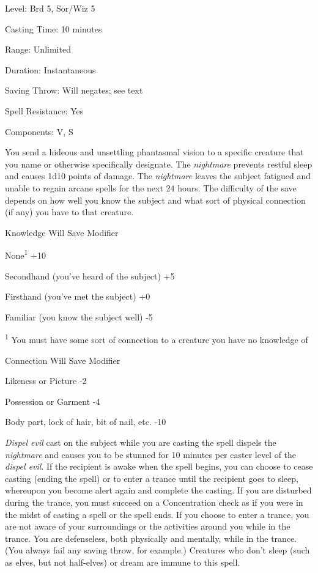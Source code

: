 
\begin{description*}
\item[Level:] Brd 5, Sor/Wiz 5
\item[Casting Time:] 10 minutes
\item[Range:] Unlimited
\item[Duration:] Instantaneous
\item[Saving Throw:] Will negates; see text
\item[Spell Resistance:] Yes
\item[Components:] V, S
\end{description*}

You send a hideous and unsettling phantasmal vision to a specific creature that
you name or otherwise specifically designate.
The \textit{nightmare} prevents restful sleep and causes 1d10 points of damage.
The \textit{nightmare} leaves the subject fatigued and unable to regain arcane
spells for the next 24 hours.
The difficulty of the save depends on how well you know the subject and what sort
of physical connection (if any) you have to that creature.
\begin{description*}
\item[Knowledge] Will Save Modifier
\item[None\textsuperscript{1}] +10
\item[Secondhand (you've heard of the subject)] +5
\item[Firsthand (you've met the subject)] +0
\item[Familiar (you know the subject well)] -5
\end{description*}
\textsuperscript{1} You must have some sort of connection to a creature you have no knowledge of
\begin{description*}
\item[Connection] Will Save Modifier
\item[Likeness or Picture] -2
\item[Possession or Garment] -4
\item[Body part, lock of hair, bit of nail, etc.] -10
\end{description*}
\textit{Dispel evil} cast on the subject while you are casting the spell dispels
the \textit{nightmare} and causes you to be stunned for 10 minutes per caster level
of the \textit{dispel evil}.
If the recipient is awake when the spell begins, you can choose to cease casting
(ending the spell) or to enter a trance until the recipient goes to sleep, whereupon
you become alert again and complete the casting. If you are disturbed during the
trance, you must succeed on a Concentration check as if you were in the midst of
casting a spell or the spell ends.
If you choose to enter a trance, you are not aware of your surroundings or the
activities around you while in the trance.
You are defenseless, both physically and mentally, while in the trance. (You always
fail any saving throw, for example.)
Creatures who don't sleep (such as elves, but not half-elves) or dream are immune
to this spell.